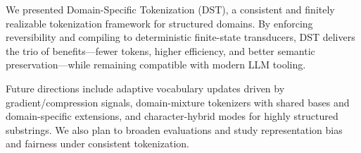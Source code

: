We presented Domain-Specific Tokenization (DST), a consistent and finitely realizable tokenization framework for structured domains. By enforcing reversibility and compiling to deterministic finite-state transducers, DST delivers the trio of benefits—fewer tokens, higher efficiency, and better semantic preservation—while remaining compatible with modern LLM tooling.

Future directions include adaptive vocabulary updates driven by gradient/compression signals, domain-mixture tokenizers with shared bases and domain-specific extensions, and character-hybrid modes for highly structured substrings. We also plan to broaden evaluations and study representation bias and fairness under consistent tokenization.

